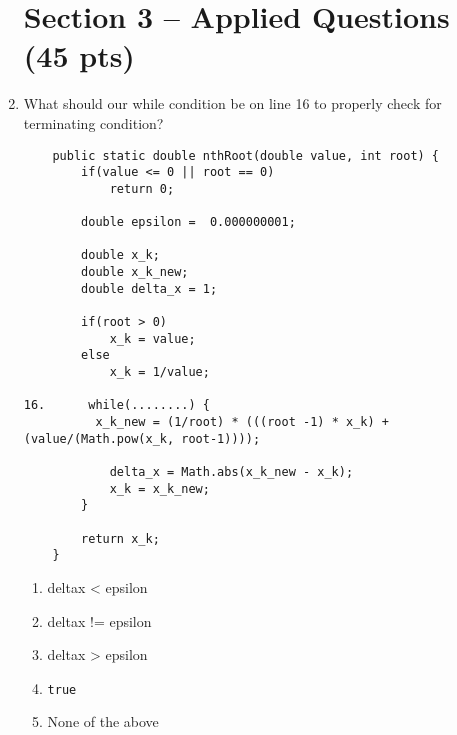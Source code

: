 \documentclass[S17-Final.tex]{subfiles}
\begin{document}
\begin{enumerate}



	
\clearpage
\section*{Section 3 -- Applied Questions (45 pts)}
\item What should our while condition be on line 16 to properly check for terminating condition?
\begin{lstlisting}
    public static double nthRoot(double value, int root) {
  		if(value <= 0 || root == 0)
    		return 0;

		double epsilon =  0.000000001;
		
		double x_k;
		double x_k_new;
		double delta_x = 1;
		
		if(root > 0)
		    x_k = value;
		else
		    x_k = 1/value;

16.      while(........) {
          x_k_new = (1/root) * (((root -1) * x_k) + (value/(Math.pow(x_k, root-1))));
   		    
            delta_x = Math.abs(x_k_new - x_k);
            x_k = x_k_new;
        }
	
        return x_k;
    }
\end{lstlisting}
	
\begin{enumerate}
\item  delta\textunderscore x \textless{} epsilon
\item  delta\textunderscore x {!=} epsilon
\item  delta\textunderscore x \textgreater{} epsilon
\item  \texttt{true}
\item  None of the above
\end{enumerate}


\end{enumerate}
\end{document}

